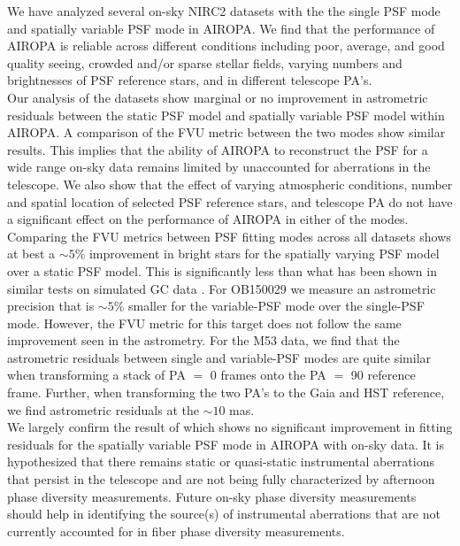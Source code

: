 \documentclass[]{spie}  %
\begin{document}
\indent We have analyzed several on-sky NIRC2 datasets with the the single PSF mode and spatially variable PSF mode in AIROPA. We find that the performance of AIROPA is reliable across different conditions including poor, average, and good quality seeing, crowded and/or sparse stellar fields, varying numbers and brightnesses of PSF reference stars, and in different telescope PA's.
\\
\indent Our analysis of the datasets show marginal or no improvement in astrometric residuals between the static PSF model and spatially variable PSF model within AIROPA. A comparison of the FVU metric between the two modes show similar results. This implies that the ability of AIROPA to reconstruct the PSF for a wide range on-sky data remains limited by unaccounted for aberrations in the telescope. We also show that the effect of varying atmospheric conditions, number and spatial location of selected PSF reference stars, and telescope PA do not have a significant effect on the performance of AIROPA in either of the modes.
\\
\indent Comparing the FVU metrics between PSF fitting modes across all datasets shows at best a ${\sim}5\%$ improvement in bright stars for the spatially varying PSF model over a static PSF model. This is significantly less than what has been shown in similar tests on simulated GC data \citep{Turri:inprep}. For OB150029 we measure an astrometric precision that is ${\sim}5\%$ smaller for the variable-PSF mode over the single-PSF mode. However, the FVU metric for this target does not follow the same improvement seen in the astrometry. For the M53 data, we find that the astrometric residuals between single and variable-PSF modes are quite similar when transforming a stack of PA $=$ 0 frames onto the PA $=$ 90 reference frame. Further, when transforming the two PA's to the Gaia and HST reference, we find astrometric residuals at the $\sim 10$ mas.
\\
\indent We largely confirm the result of \cite{Turri:inprep} which shows no significant improvement in fitting residuals for the spatially variable PSF mode in AIROPA with on-sky data. It is hypothesized that there remains static or quasi-static instrumental aberrations that persist in the telescope and are not being fully characterized by afternoon phase diversity measurements. Future on-sky phase diversity measurements should help in identifying the source(s) of instrumental aberrations that are not currently accounted for in fiber phase diversity measurements. 
\end{document}
